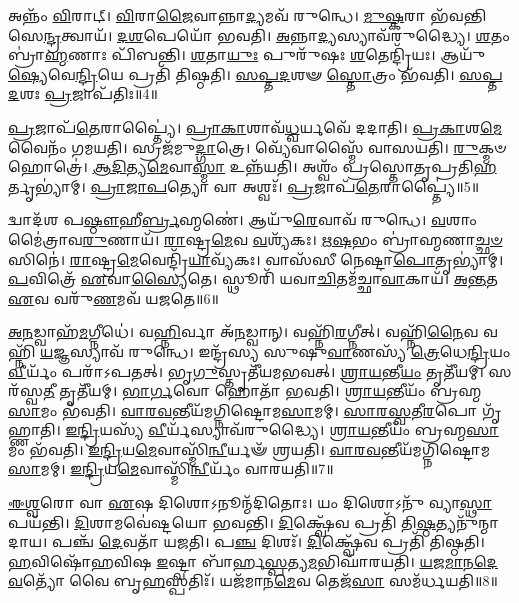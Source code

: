 𑌅𑌨𑍍𑌨𑌂᳴ \ul{𑌵𑌿}\-𑌰𑌾𑌟𑍍।
\-\ul{𑌵𑌿}\-𑌰𑌾\-\ul{𑌜𑍈}\-𑌵𑌾𑌨𑍍𑌨𑌾\-\ul{𑌦𑍍𑌯}\-𑌮𑌵᳴ 𑌰𑍁𑌨𑍍𑌧𑍇।
\-\ul{𑌮𑍁}\-\-\ul{𑌷𑍍𑌕}\-𑌰𑌾 𑌭᳴𑌵𑌨𑍍𑌤𑌿 𑌸𑍇\-\ul{𑌨𑍍𑌦𑍍𑌰}\-𑌤𑍍𑌵𑌾𑌯᳴।
\-\ul{𑌦}\-\-\ul{𑌶}\-𑌪𑍇𑌯𑍋᳴ 𑌭𑌵𑌤𑌿।
\-\ul{𑌅}\-𑌨𑍍𑌨𑌾\-\ul{𑌦𑍍𑌯}\-𑌸𑍍𑌯𑌾𑌵᳴𑌰𑍁𑌦𑍍𑌧𑍍𑌯𑍈।
\-\ul{𑌶}\-𑌤𑌂 𑌬𑍍𑌰𑌾॑\-\ul{𑌹𑍍𑌮}\-𑌣𑌾𑌃 𑌪𑌿᳴𑌬𑌨𑍍𑌤𑌿।
\-\ul{𑌶}\-𑌤𑌾\-\ul{𑌯𑍁𑌃} 𑌪𑍁𑌰𑍁᳴𑌷𑌃 \ul{𑌶}\-𑌤𑍇𑌨𑍍𑌦𑍍𑌰𑌿᳴𑌯𑌃।
𑌆𑌯𑍁᳴\-\ul{𑌷𑍍𑌯𑍇}\-𑌵𑍇\-\ul{𑌨𑍍𑌦𑍍𑌰𑌿}\-𑌯𑍇 𑌪𑍍𑌰𑌤𑌿᳴ 𑌤𑌿𑌷𑍍𑌠𑌤𑌿।
\-\ul{𑌸}\-\-\ul{𑌪𑍍𑌤}\-\-\ul{𑌦}\-𑌶𑍟 \ul{𑌸𑍍𑌤𑍋}\-𑌤𑍍𑌰𑌂 𑌭᳴𑌵𑌤𑌿।
\-\ul{𑌸}\-\-\ul{𑌪𑍍𑌤}\-\-\ul{𑌦}\-𑌶𑌃 \ul{𑌪𑍍𑌰}\-𑌜𑌾\-𑌪᳴𑌤𑌿𑌃॥4॥

\-\ul{𑌪𑍍𑌰}\-𑌜𑌾𑌪᳴\-\ul{𑌤𑍇}\-𑌰𑌾𑌪𑍍𑌤𑍍𑌯𑍈॑।
\-\ul{𑌪𑍍𑌰𑌾}\-\-\ul{𑌕𑌾}\-𑌶𑌾𑌵᳴\-\ul{𑌧𑍍𑌵}\-𑌰𑍍𑌯𑌵𑍇᳴ 𑌦𑌦𑌾𑌤𑌿।
\-\ul{𑌪𑍍𑌰}\-\-\ul{𑌕𑌾}\-𑌶\-\ul{𑌮𑍇}\-𑌵𑍈𑌨𑌂᳴ 𑌗𑌮𑌯𑌤𑌿।
𑌸𑍍𑌰𑌜᳴𑌮𑍁\-\ul{𑌦𑍍𑌗𑌾}\-𑌤𑍍𑌰𑍇।
𑌵𑍍𑌯𑍇᳴𑌵𑌾𑌸𑍍𑌮𑍈᳴ 𑌵𑌾𑌸𑌯𑌤𑌿।
\-\ul{𑌰𑍁}\-𑌕𑍍𑌮𑍞 𑌹𑍋𑌤𑍍𑌰𑍇॑।
\-\ul{𑌆}\-\-\ul{𑌦𑌿}\-𑌤𑍍𑌯\-\ul{𑌮𑍇}\-𑌵𑌾\-\ul{𑌸𑍍𑌮𑌾} 𑌉𑌨𑍍𑌨᳴𑌯𑌤𑌿।
𑌅𑌶𑍍𑌵𑌂᳴ 𑌪𑍍𑌰𑌸𑍍𑌤𑍋𑌤𑍃𑌪𑍍𑌰𑌤𑌿\-\ul{𑌹}\-𑌰𑍍𑌤𑍃𑌭𑍍𑌯𑌾॑𑌮𑍍।
\-\ul{𑌪𑍍𑌰𑌾}\-\-\ul{𑌜𑌾}\-\-\ul{𑌪}\-𑌤𑍍𑌯𑍋 𑌵𑌾 𑌅𑌶𑍍𑌵𑌃᳴।
\-\ul{𑌪𑍍𑌰}\-𑌜𑌾𑌪᳴\-\ul{𑌤𑍇}\-𑌰𑌾𑌪𑍍𑌤𑍍𑌯𑍈॑॥5॥

𑌦𑍍𑌵𑌾𑌦᳴𑌶 𑌪\-\ul{𑌷𑍍𑌠𑍗}\-𑌹𑍀\-\ul{𑌰𑍍𑌬𑍍𑌰}\-𑌹𑍍𑌮𑌣𑍇॑।
𑌆𑌯𑍁᳴\-\ul{𑌰𑍇}\-𑌵𑌾𑌵᳴ 𑌰𑍁𑌨𑍍𑌧𑍇।
\-\ul{𑌵}\-𑌶𑌾𑌂 𑌮𑍈॑𑌤𑍍𑌰𑌾𑌵\-\ul{𑌰𑍁}\-𑌣𑌾𑌯᳴।
\-\ul{𑌰𑌾}\-𑌷𑍍𑌟𑍍𑌰\-\ul{𑌮𑍇}\-𑌵 \ul{𑌵}\-𑌶𑍍𑌯᳴𑌕𑌃।
\-\ul{𑌋}\-\-\ul{𑌷}\-𑌭𑌂 𑌬𑍍𑌰𑌾॑𑌹𑍍𑌮𑌣𑌾\-\ul{𑌚𑍍𑌛}\-\-\ul{𑍞}\-𑌸𑌿𑌨𑍇॑।
\-\ul{𑌰𑌾}\-𑌷𑍍𑌟𑍍𑌰\-\ul{𑌮𑍇}\-𑌵𑍇𑌨𑍍𑌦𑍍𑌰𑌿᳴\-\ul{𑌯𑌾}\-\-𑌵𑍍𑌯᳴𑌕𑌃।
𑌵𑌾𑌸᳴𑌸𑍀 𑌨𑍇𑌷𑍍𑌟𑌾\-\ul{𑌪𑍋}\-𑌤𑍃𑌭𑍍𑌯𑌾॑𑌮𑍍।
\-\ul{𑌪}\-𑌵𑌿𑌤𑍍𑌰𑍇᳴ \ul{𑌏}\-𑌵𑌾\-\ul{𑌸𑍍𑌯𑍈}\-𑌤𑍇।
𑌸𑍍𑌥𑍂𑌰𑌿᳴ 𑌯𑌵𑌾\-\ul{𑌚𑌿}\-𑌤𑌮᳴𑌚𑍍𑌛𑌾\-\ul{𑌵𑌾}\-𑌕𑌾𑌯᳴।
\-\ul{𑌅}\-\-\ul{𑌨𑍍𑌤}\-𑌤 \ul{𑌏}\-𑌵 𑌵𑌰𑍁᳴\-\ul{𑌣}\-𑌮𑌵᳴ 𑌯𑌜𑌤𑍇॥6॥

\-\ul{𑌅}\-\-\ul{𑌨}\-𑌡𑍍𑌵𑌾𑌹᳴\-\ul{𑌮}\-𑌗𑍍𑌨𑍀𑌧𑍇॑।
𑌵\-\ul{𑌹𑍍𑌨𑌿}\-𑌰𑍍𑌵𑌾 𑌅᳴\-\ul{𑌨}\-𑌡𑍍𑌵𑌾𑌨𑍍।
𑌵𑌹𑍍𑌨𑌿᳴\-\ul{𑌰}\-𑌗𑍍𑌨𑍀𑌤𑍍।
𑌵𑌹𑍍𑌨𑌿᳴\-\ul{𑌨𑍈}\-𑌵 𑌵𑌹𑍍𑌨𑌿᳴ \ul{𑌯}\-𑌜𑍍𑌞𑌸𑍍𑌯𑌾𑌵᳴ 𑌰𑍁𑌨𑍍𑌧𑍇।
𑌇𑌨𑍍𑌦𑍍𑌰᳴𑌸𑍍𑌯 𑌸𑍁𑌷𑍁\-\ul{𑌵𑌾}\-𑌣𑌸𑍍𑌯᳴ \ul{𑌤𑍍𑌰𑍇}\-𑌧𑍇\-\ul{𑌨𑍍𑌦𑍍𑌰𑌿}\-𑌯𑌂 \ul{𑌵𑍀}\-𑌰𑍍𑌯𑌂᳴ 𑌪𑌰𑌾᳴\-𑌽𑌪𑌤𑌤𑍍।
𑌭𑍃\-\ul{𑌗𑍁}\-𑌸𑍍𑌤𑍃𑌤𑍀᳴𑌯𑌮𑌭𑌵𑌤𑍍।
\-\ul{𑌶𑍍𑌰𑌾}\-\-\ul{𑌯}\-𑌨𑍍𑌤𑍀\-\ul{𑌯𑌂} 𑌤𑍃𑌤𑍀᳴𑌯𑌮𑍍।
𑌸𑌰᳴𑌸𑍍𑌵\-\ul{𑌤𑍀} 𑌤𑍃𑌤𑍀᳴𑌯𑌮𑍍।
\-\ul{𑌭𑌾}\-\-\ul{𑌰𑍍𑌗}\-𑌵𑍋 𑌹𑍋𑌤𑌾᳴ 𑌭𑌵𑌤𑌿।
\-\ul{𑌶𑍍𑌰𑌾}\-\-\ul{𑌯}\-𑌨𑍍𑌤𑍀𑌯𑌂᳴ 𑌬𑍍𑌰𑌹𑍍𑌮\-\ul{𑌸𑌾}\-𑌮𑌂 𑌭᳴𑌵𑌤𑌿।
\-\ul{𑌵𑌾}\-\-\ul{𑌰}\-\-\ul{𑌵}\-𑌨𑍍𑌤𑍀𑌯᳴𑌮𑌗𑍍𑌨𑌿𑌷𑍍𑌟𑍋𑌮\-\ul{𑌸𑌾}\-𑌮𑌮𑍍।
\-\ul{𑌸𑌾}\-\-\ul{𑌰}\-\-\ul{𑌸𑍍𑌵}\-𑌤𑍀\-\ul{𑌰}\-𑌪𑍋 𑌗𑍃᳴𑌹𑍍𑌣𑌾𑌤𑌿।
\-\ul{𑌇}\-\-\ul{𑌨𑍍𑌦𑍍𑌰𑌿}\-𑌯𑌸𑍍𑌯᳴ \ul{𑌵𑍀}\-𑌰𑍍𑌯᳴𑌸𑍍𑌯𑌾𑌵᳴𑌰𑍁𑌦𑍍𑌧𑍍𑌯𑍈।
\-\ul{𑌶𑍍𑌰𑌾}\-\-\ul{𑌯}\-𑌨𑍍𑌤𑍀𑌯𑌂᳴ 𑌬𑍍𑌰𑌹𑍍𑌮\-\ul{𑌸𑌾}\-𑌮𑌂 𑌭᳴𑌵𑌤𑌿।
\-\ul{𑌇}\-\-\ul{𑌨𑍍𑌦𑍍𑌰𑌿}\-𑌯\-\ul{𑌮𑍇}\-𑌵𑌾𑌸𑍍𑌮𑌿᳴\-\ul{𑌨𑍍𑌵𑍀}\-𑌰𑍍𑌯𑍟᳴ 𑌶𑍍𑌰𑌯𑌤𑌿।
\-\ul{𑌵𑌾}\-\-\ul{𑌰}\-\-\ul{𑌵}\-𑌨𑍍𑌤𑍀𑌯᳴𑌮𑌗𑍍𑌨𑌿𑌷𑍍𑌟𑍋𑌮\-\ul{𑌸𑌾}\-𑌮𑌮𑍍।
\-\ul{𑌇}\-\-\ul{𑌨𑍍𑌦𑍍𑌰𑌿}\-𑌯\-\ul{𑌮𑍇}\-𑌵𑌾𑌸𑍍𑌮𑌿᳴\-\ul{𑌨𑍍𑌵𑍀}\-𑌰𑍍𑌯𑌂᳴ 𑌵𑌾𑌰𑌯𑌤𑌿॥7॥\anuvakamend[\-\ul{𑌵𑌿}\-𑌰𑌾\-\ul{𑌟𑍍𑌪𑍍𑌰}\-𑌜𑌾𑌪᳴\-\ul{𑌤𑌿}\-𑌰𑌶𑍍𑌵𑌃᳴ \ul{𑌪𑍍𑌰}\-𑌜𑌾𑌪᳴\-\ul{𑌤𑍇}\-𑌰𑌾𑌪𑍍𑌤𑍍𑌯𑍈᳴ 𑌯𑌜𑌤𑍇 𑌬𑍍𑌰𑌹𑍍𑌮\-\ul{𑌸𑌾}\-𑌮𑌂 𑌭᳴𑌵𑌤𑌿 \ul{𑌸}\-𑌪𑍍𑌤 𑌚᳴]

\-\ul{𑌈}\-\-\ul{𑌶𑍍𑌵}\-𑌰𑍋 𑌵𑌾 \ul{𑌏}\-𑌷 𑌦𑌿𑌶𑍋\-𑌽𑌨𑍂𑌨𑍍𑌮᳴𑌦𑌿𑌤𑍋𑌃।
𑌯𑌂 𑌦𑌿𑌶𑍋𑌽𑌨𑍁᳴ 𑌵𑍍𑌯𑌾\-\ul{𑌸𑍍𑌥𑌾}\-𑌪𑌯᳴𑌨𑍍𑌤𑌿।
\-\ul{𑌦𑌿}\-𑌶𑌾𑌮𑌵𑍇॑𑌷𑍍𑌟𑌯𑍋 𑌭𑌵𑌨𑍍𑌤𑌿।
\-\ul{𑌦𑌿}\-𑌕𑍍𑌷𑍍𑌵𑍇᳴𑌵 𑌪𑍍𑌰𑌤𑌿᳴ 𑌤𑌿\-\ul{𑌷𑍍𑌠}\-𑌤𑍍𑌯𑌨𑍁᳴𑌨𑍍𑌮𑌾𑌦𑌾𑌯।
𑌪𑌞𑍍𑌚᳴ \ul{𑌦𑍇}\-𑌵𑌤𑌾᳴ 𑌯𑌜𑌤𑌿।
𑌪\-\ul{𑌞𑍍𑌚} 𑌦𑌿𑌶𑌃᳴।
\-\ul{𑌦𑌿}\-𑌕𑍍𑌷𑍍𑌵𑍇᳴𑌵 𑌪𑍍𑌰𑌤𑌿᳴ 𑌤𑌿𑌷𑍍𑌠𑌤𑌿।
\-\ul{𑌹}\-𑌵𑌿𑌷𑍋᳴𑌹𑌵𑌿𑌷 \ul{𑌇}\-𑌷𑍍𑌟𑍍𑌵𑌾 𑌬𑌾᳴𑌰𑍍\mbox{}𑌹\-\ul{𑌸𑍍𑌪}\-𑌤𑍍𑌯\-\ul{𑌮}\-𑌭𑌿𑌘𑌾᳴𑌰𑌯𑌤𑌿।
\-\ul{𑌯}\-\-\ul{𑌜}\-\-\ul{𑌮𑌾}\-\-\ul{𑌨}\-\-\ul{𑌦𑍇}\-\-\ul{𑌵}\-𑌤𑍍𑌯𑍋᳴ 𑌵𑍈 𑌬𑍃\-\ul{𑌹}\-𑌸𑍍𑌪𑌤𑌿𑌃᳴।
𑌯𑌜᳴𑌮𑌾𑌨\-\ul{𑌮𑍇}\-𑌵 𑌤𑍇𑌜᳴\-\ul{𑌸𑌾} 𑌸𑌮᳴𑌰𑍍𑌧𑌯𑌤𑌿॥8॥

